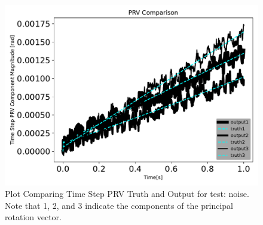 \begin{figure}[htbp]\centerline{\includegraphics[height=0.7\textwidth, keepaspectratio]{AutoTeX/noisePRVcomparison}}\caption{Plot Comparing Time Step PRV Truth and Output for test: noise. Note that 1, 2, and 3 indicate the components of the principal rotation vector.}\label{fig:noisePRVcomparison}\end{figure}